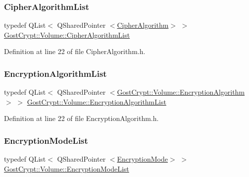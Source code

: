 \subsubsection{\texorpdfstring{Cipher\+Algorithm\+List}{CipherAlgorithmList}}
{\footnotesize\ttfamily typedef Q\+List$<$ Q\+Shared\+Pointer $<$\hyperlink{class_gost_crypt_1_1_volume_1_1_cipher_algorithm}{Cipher\+Algorithm}$>$ $>$ \hyperlink{namespace_gost_crypt_1_1_volume_ad32c730cdf3a63d2bafbac0f63f0740f}{Gost\+Crypt\+::\+Volume\+::\+Cipher\+Algorithm\+List}}



Definition at line 22 of file Cipher\+Algorithm.\+h.

\mbox{\label{namespace_gost_crypt_1_1_volume_ae58c307b345c639d35f6dc68af4017b5}} 
\subsubsection{\texorpdfstring{Encryption\+Algorithm\+List}{EncryptionAlgorithmList}}
{\footnotesize\ttfamily typedef Q\+List$<$ Q\+Shared\+Pointer $<$\hyperlink{class_gost_crypt_1_1_volume_1_1_encryption_algorithm}{Gost\+Crypt\+::\+Volume\+::\+Encryption\+Algorithm}$>$ $>$ \hyperlink{namespace_gost_crypt_1_1_volume_ae58c307b345c639d35f6dc68af4017b5}{Gost\+Crypt\+::\+Volume\+::\+Encryption\+Algorithm\+List}}



Definition at line 22 of file Encryption\+Algorithm.\+h.

\mbox{\label{namespace_gost_crypt_1_1_volume_a94b281aaee6b2ca9317cf8bf25605f79}} 
\subsubsection{\texorpdfstring{Encryption\+Mode\+List}{EncryptionModeList}}
{\footnotesize\ttfamily typedef Q\+List$<$ Q\+Shared\+Pointer $<$\hyperlink{class_gost_crypt_1_1_volume_1_1_encryption_mode}{Encryption\+Mode}$>$ $>$ \hyperlink{namespace_gost_crypt_1_1_volume_a94b281aaee6b2ca9317cf8bf25605f79}{Gost\+Crypt\+::\+Volume\+::\+Encryption\+Mode\+List}}



